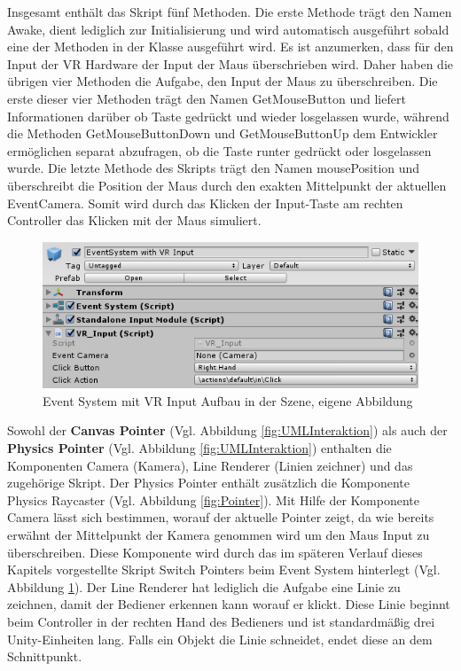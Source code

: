 Insgesamt enthält das Skript fünf Methoden. Die erste Methode trägt den Namen Awake, dient lediglich zur Initialisierung und wird automatisch ausgeführt sobald eine der Methoden in der Klasse ausgeführt wird. Es ist anzumerken, dass für den Input der VR Hardware der Input der Maus überschrieben wird. Daher haben die übrigen vier Methoden die Aufgabe, den Input der Maus zu überschreiben. Die erste dieser vier Methoden trägt den Namen GetMouseButton und liefert Informationen darüber ob Taste gedrückt und wieder losgelassen wurde, während die Methoden GetMouseButtonDown und GetMouseButtonUp dem Entwickler ermöglichen separat abzufragen, ob die Taste runter gedrückt oder losgelassen wurde. Die letzte Methode des Skripts trägt den Namen mousePosition und überschreibt die Position der Maus durch den exakten Mittelpunkt der aktuellen EventCamera. Somit wird durch das Klicken der Input-Taste am rechten Controller das Klicken mit der Maus simuliert.
\begin{figure}[h]
	\centering
	\includegraphics[width=0.6\linewidth]{Bilder/A41_EventSystem}
	\caption{Event System mit VR Input Aufbau in der Szene, eigene Abbildung}
	\label{fig:EventSystem}
\end{figure}
\newline
Sowohl der \textbf{Canvas Pointer} (Vgl. Abbildung \ref{fig:UMLInteraktion}) als auch der \textbf{Physics Pointer} (Vgl. Abbildung \ref{fig:UMLInteraktion}) enthalten die Komponenten Camera (Kamera), Line Renderer (Linien zeichner) und das zugehörige Skript. Der Physics Pointer enthält zusätzlich die Komponente Physics Raycaster (Vgl. Abbildung \ref{fig:Pointer}). Mit Hilfe der Komponente Camera lässt sich bestimmen, worauf der aktuelle Pointer zeigt, da wie bereits erwähnt der Mittelpunkt der Kamera genommen wird um den Maus Input zu überschreiben. Diese Komponente wird durch das im späteren Verlauf dieses Kapitels vorgestellte Skript Switch Pointers beim Event System hinterlegt (Vgl. Abbildung \ref{fig:EventSystem}). Der Line Renderer hat lediglich die Aufgabe eine Linie zu zeichnen, damit der Bediener erkennen kann worauf er klickt. Diese Linie beginnt beim Controller in der rechten Hand des Bedieners und ist standardmäßig drei Unity-Einheiten lang. Falls ein Objekt die Linie schneidet, endet diese an dem Schnittpunkt. 

